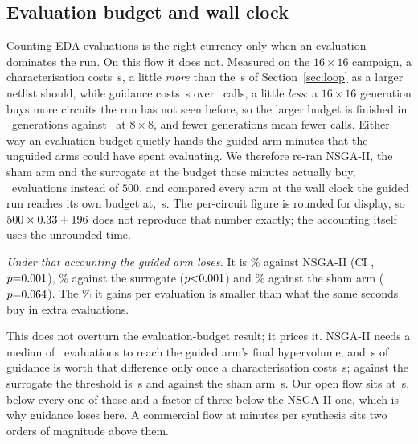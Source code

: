 \documentclass[acmsmall,review,anonymous]{acmart}
\begin{document}
\subsection{Evaluation budget and wall clock}
\label{sec:walltime}
Counting EDA evaluations is the right currency only when an evaluation
dominates the run.  On this flow it does not.  Measured on the $16\times16$
campaign, a characterisation costs \SecPerCircuitWide\,s, a little \emph{more}
than the \SecPerCircuit\,s of Section~\ref{sec:loop} as a larger netlist should,
while guidance costs \GuidanceSecondsWide\,s over \CallsSixteenU\ calls, a
little \emph{less}: a $16\times16$ generation buys more circuits the run has not
seen before, so the larger budget is finished in \GensSixteenU\ generations
against \GensEight\ at $8\times8$, and fewer generations mean fewer calls.
Either way an evaluation budget quietly hands the guided arm minutes that the
unguided arms could have spent evaluating.  We therefore re-ran NSGA-II, the sham arm and the
surrogate at the budget those minutes actually buy, \EqTimeEvals\ evaluations
instead of $500$, and compared every arm at the wall clock the guided run
reaches its own budget at, \EqTimeSeconds\,s.  The per-circuit figure is
rounded for display, so $500\times0.33+196$ does
not reproduce that number exactly; the accounting itself uses the unrounded
time.

\emph{Under that accounting the guided arm loses.}  It is \EqTimeNSGA\%
against NSGA-II (CI \EqTimeNSGACI, $p{=}0.001$), \EqTimeRF\% against the
surrogate ($p{<}0.001$) and \EqTimeSham\% against the sham arm
($p{=}0.064$).  The \ShamSixteenU\% it gains per evaluation is smaller
than what the same seconds buy in extra evaluations.

This does not overturn the evaluation-budget result; it prices it.  NSGA-II
needs a median of \MatchNSGA\ evaluations to reach the guided arm's final
hypervolume, and \GuidanceSecondsWide\,s of guidance is worth that difference
only once a characterisation costs \BreakEvenNSGA\,s; against the surrogate the
threshold is \BreakEvenRF\,s and against the sham arm \BreakEvenSham\,s.  Our
open flow sits at \SecPerCircuitWide\,s, below every one of those and a factor
of three below the NSGA-II one, which is why guidance loses here.  A commercial flow at minutes per
synthesis sits two orders of magnitude above them.
\end{document}
